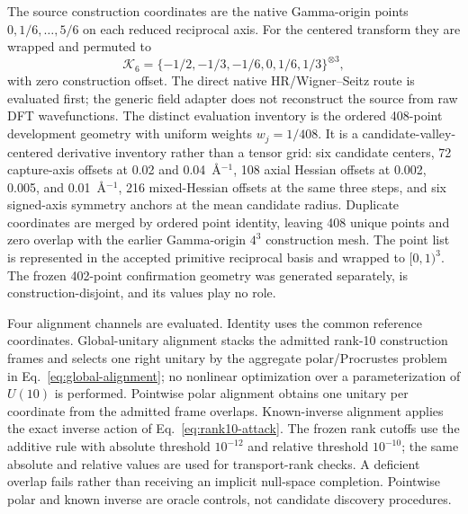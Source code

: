 \documentclass[11pt]{article}
\theoremstyle{definition}
\begin{document}
The source construction coordinates are the native Gamma-origin points
$0,1/6,\ldots,5/6$ on each reduced reciprocal axis.  For the centered transform they
are wrapped and permuted to
\begin{equation}
 \mathcal K_6=\{-1/2,-1/3,-1/6,0,1/6,1/3\}^{\otimes3},
 \label{eq:centered-c6-grid}
\end{equation}
with zero construction offset.  The direct native HR/Wigner--Seitz route is evaluated
first; the generic field adapter does not reconstruct the source from raw DFT
wavefunctions.  The distinct evaluation inventory is the ordered 408-point development
geometry with uniform weights $w_j=1/408$.  It is a candidate-valley-centered derivative
inventory rather than a tensor grid: six candidate centers, 72 capture-axis offsets at
0.02 and 0.04~\AA$^{-1}$, 108 axial Hessian offsets at 0.002, 0.005, and
0.01~\AA$^{-1}$, 216 mixed-Hessian offsets at the same three steps, and six signed-axis
symmetry anchors at the mean candidate radius.  Duplicate coordinates are merged by
ordered point identity, leaving 408 unique points and zero overlap with the earlier
Gamma-origin $4^3$ construction mesh.  The point list is represented in the accepted
primitive reciprocal basis and wrapped to $[0,1)^3$.  The frozen 402-point confirmation
geometry was generated separately, is construction-disjoint, and its values play no
role.

Four alignment channels are evaluated.  Identity uses the common reference coordinates.
Global-unitary alignment stacks the admitted rank-10 construction frames and selects
one right unitary by the aggregate polar/Procrustes problem in
Eq.~\eqref{eq:global-alignment}; no nonlinear optimization over a parameterization of
$U(10)$ is performed.  Pointwise polar alignment obtains one unitary per coordinate from
the admitted frame overlaps.  Known-inverse alignment applies the exact inverse action
of Eq.~\eqref{eq:rank10-attack}.  The frozen rank cutoffs use the additive rule with
absolute threshold $10^{-12}$ and relative threshold $10^{-10}$; the same absolute and
relative values are used for transport-rank checks.  A deficient overlap fails rather
than receiving an implicit null-space completion.  Pointwise polar and known inverse
are oracle controls, not candidate discovery procedures.
\end{document}
